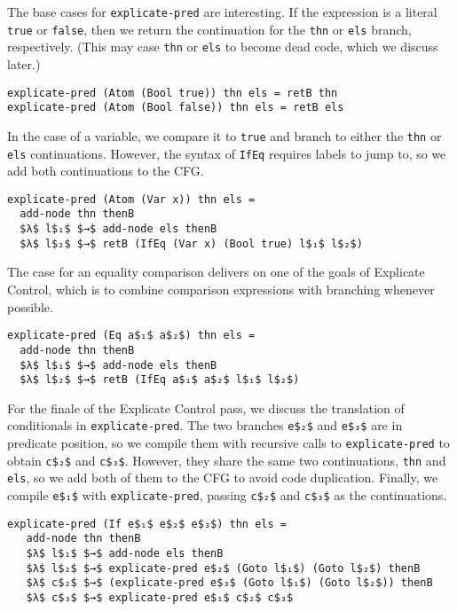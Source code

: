 \documentclass[sigplan,review,dvipsnames,screen,10pt]{acmart}
\begin{document}
The base cases for \lstinline{explicate-pred} are interesting.  If the
expression is a literal \lstinline{true} or \lstinline{false}, then we
return the continuation for the \lstinline{thn} or \lstinline{els}
branch, respectively. (This may case \lstinline{thn} or
\lstinline{els} to become dead code, which we discuss later.)

\begin{lstlisting}
explicate-pred (Atom (Bool true)) thn els = retB thn
explicate-pred (Atom (Bool false)) thn els = retB els
\end{lstlisting}

\noindent In the case of a variable, we compare it to \lstinline{true}
and branch to either the \lstinline{thn} or \lstinline{els}
continuations. However, the syntax of \lstinline{IfEq} requires labels
to jump to, so we add both continuations to the CFG.

\begin{lstlisting}
explicate-pred (Atom (Var x)) thn els =
  add-node thn thenB
  $λ$ l$₁$ $→$ add-node els thenB
  $λ$ l$₂$ $→$ retB (IfEq (Var x) (Bool true) l$₁$ l$₂$)
\end{lstlisting}

\noindent The case for an equality comparison delivers on one of the
goals of Explicate Control, which is to combine comparison expressions
with branching whenever possible.

\begin{lstlisting}
explicate-pred (Eq a$₁$ a$₂$) thn els =
  add-node thn thenB
  $λ$ l$₁$ $→$ add-node els thenB
  $λ$ l$₂$ $→$ retB (IfEq a$₁$ a$₂$ l$₁$ l$₂$)
\end{lstlisting}

For the finale of the Explicate Control pass, we discuss the
translation of conditionals in \lstinline{explicate-pred}.  The two
branches \lstinline{e$₂$} and \lstinline{e$₃$} are in predicate
position, so we compile them with recursive calls to
\lstinline{explicate-pred} to obtain \lstinline{c$₂$} and
\lstinline{c$₃$}. However, they share the same two continuations,
\lstinline{thn} and \lstinline{els}, so we add both of them to the CFG
to avoid code duplication. Finally, we compile \lstinline{e$₁$} with
\lstinline{explicate-pred}, passing \lstinline{c$₂$} and
\lstinline{c$₃$} as the continuations.

\begin{lstlisting}
explicate-pred (If e$₁$ e$₂$ e$₃$) thn els =
   add-node thn thenB
   $λ$ l$₁$ $→$ add-node els thenB
   $λ$ l$₂$ $→$ explicate-pred e$₂$ (Goto l$₁$) (Goto l$₂$) thenB
   $λ$ c$₂$ $→$ (explicate-pred e$₃$ (Goto l$₁$) (Goto l$₂$)) thenB
   $λ$ c$₃$ $→$ explicate-pred e$₁$ c$₂$ c$₃$
\end{lstlisting}
\end{document}
